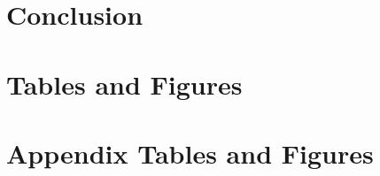 \documentclass[11pt,letterpaper]{article}
\begin{document}


\section{Conclusion \label{sec:conclusion}}





\singlespacing	
 


\section{Tables and Figures}




\clearpage
\appendix
\section{Appendix Tables and Figures}
\label{subsec:apptab}
\setcounter{table}{0}
\renewcommand{\thetable}{A\arabic{table}}   
\setcounter{figure}{0}
\renewcommand{\thefigure}{A\arabic{figure}}   
\end{document}
